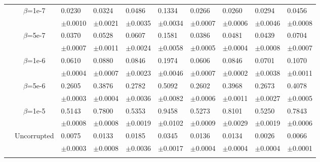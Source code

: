 \documentclass{article}
\begin{document}
\begin{table}[h!]
{\begin{tabularx}{\textwidth}{ccX X X X X X X X}
        & \multirow{2}{*}{$\beta$=1e-7}
        & 0.0230 & 0.0324 & 0.0486 & 0.1334 & 0.0266 & 0.0260 & 0.0294 & 0.0456\\
        &&\scriptsize$\pm$0.0010 & \scriptsize $\pm$0.0021 & \scriptsize $\pm$0.0035 & \scriptsize $\pm$0.0034 & \scriptsize $\pm$0.0007 & \scriptsize $\pm$0.0006 & \scriptsize $\pm$0.0046 & \scriptsize $\pm$0.0008\\
        \cline{3-10}\rule{0pt}{2.3ex}

        & \multirow{2}{*}{$\beta$=5e-7}
        & 0.0370 & 0.0528 & 0.0607 & 0.1581 & 0.0386 & 0.0481 & 0.0439 & 0.0704\\
        &&\scriptsize$\pm$0.0007 & \scriptsize $\pm$0.0011 & \scriptsize $\pm$0.0024 & \scriptsize $\pm$0.0058 & \scriptsize $\pm$0.0005 & \scriptsize $\pm$0.0004 & \scriptsize $\pm$0.0008 & \scriptsize $\pm$0.0007\\
        \cline{3-10}\rule{0pt}{2.3ex}

        & \multirow{2}{*}{$\beta$=1e-6}
        & 0.0610 & 0.0880 & 0.0846 & 0.1974 & 0.0606 & 0.0846 & 0.0701 & 0.1070\\
        &&\scriptsize$\pm$0.0004 & \scriptsize $\pm$0.0007 & \scriptsize $\pm$0.0023 & \scriptsize $\pm$0.0046 & \scriptsize $\pm$0.0007 & \scriptsize $\pm$0.0002 & \scriptsize $\pm$0.0038 & \scriptsize $\pm$0.0011\\
        \cline{3-10}\rule{0pt}{2.3ex}

        & \multirow{2}{*}{$\beta$=5e-6}
        & 0.2605 & 0.3876 & 0.2782 & 0.5092 & 0.2602 & 0.3968 & 0.2673 & 0.4078\\
        &&\scriptsize$\pm$0.0003 & \scriptsize $\pm$0.0004 & \scriptsize $\pm$0.0036 & \scriptsize $\pm$0.0082 & \scriptsize $\pm$0.0006 & \scriptsize $\pm$0.0011 & \scriptsize $\pm$0.0027 & \scriptsize $\pm$0.0005\\
        \cline{3-10}\rule{0pt}{2.3ex}

        & \multirow{2}{*}{$\beta$=1e-5}
        & 0.5143 & 0.7800 & 0.5353 & 0.9458 & 0.5273 & 0.8101 & 0.5250 & 0.7843\\
        &&\scriptsize$\pm$0.0008 & \scriptsize $\pm$0.0008 & \scriptsize $\pm$0.0019 & \scriptsize $\pm$0.0102 & \scriptsize $\pm$0.0009 & \scriptsize $\pm$0.0029 & \scriptsize $\pm$0.0019 & \scriptsize $\pm$0.0006\\

        \hline\rule{0pt}{2.3ex}
        
    
        \multirow{12}{*}{$\textsf{MAE}_\textsf{symm}^{F}$}
        \rule{0pt}{2.3ex}
        &\multirow{2}{*}{Uncorrupted}
        &{0.0075} & {0.0133} & {0.0185} & {0.0345} & {0.0136} & {0.0134} & {0.0026} & {0.0066}\\
        &&\scriptsize$\pm$0.0003 & \scriptsize $\pm$0.0008 & \scriptsize $\pm$0.0036 & \scriptsize $\pm$0.0017 & \scriptsize $\pm$0.0004 & \scriptsize $\pm$0.0004 & \scriptsize $\pm$0.0004 & \scriptsize $\pm$0.0001\\
        \cline{3-10}\rule{0pt}{2.3ex}


\end{tabularx}}
\end{table}
\end{document}
